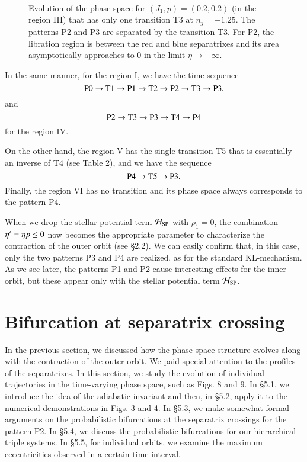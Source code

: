 \documentclass[useAMS,usenatbib,twocolumn]{mn2e}
\begin{document}
\begin{figure*}
\begin{center}
\\
\caption{Evolution of the phase space for $(J_1,p)=(0.2,0.2)$ (in the region III) that has only one transition T3 at $\eta_3=-1.25$.  The patterns P2 and P3 are separated by the transition T3.   For P2, the libration region is  between the red and blue separatrixes and its area asymptotically approaches to 0 in the limit $\eta\to -\infty$. }
\label{fig:phase2}
\end{center}
\end{figure*}


In the same manner, for the region I, we have the time sequence
$$
\rm P0 \to T1 \to P1 \to T2 \to P2 \to T3 \to P3,
$$
and
$$
\rm  P2 \to T3 \to P3  \to T4 \to P4
$$
for the region IV.


On the other hand, the region V has the single transition T5 that is essentially an inverse of T4 (see Table 2), and we have the sequence 
$$
\rm P4 \to T5 \to P3.
$$
Finally, the region VI has no transition and its phase space always corresponds to the pattern P4.





When we drop the stellar potential term ${\cal H}_{\rm SP}$ with $\rho_1=0$, the combination $\eta\rq{}\equiv \eta p\le 0$
now becomes the appropriate parameter to characterize the contraction of the outer orbit (see \S 2.2).  
We can easily confirm that, in this case, only the two patterns P3 and P4 are realized, as for the standard KL-mechanism.
As we see later, the patterns P1 and P2 cause interesting effects for the inner orbit, but these appear only with the stellar potential term ${\cal H}_{\rm SP}$.


\section{Bifurcation at separatrix crossing}
In the previous section, we discussed how the phase-space structure evolves along with the contraction of the outer orbit. 
We paid special attention to the profiles of the separatrixes. In this section, we study the evolution of individual trajectories
in the time-varying phase space, such as Figs. 8 and 9.  In \S 5.1, we introduce the idea of the adiabatic invariant and then, in \S 5.2, apply it 
to the numerical demonstrations in Figs. 3 and 4.
In \S 5.3, we make somewhat formal arguments on the probabilistic bifurcations at the separatrix crossings for the pattern P2. In \S 5.4, we discuss the  probabilistic bifurcations 
for our hierarchical triple systems. In \S 5.5, for individual orbits, we examine the maximum eccentricities observed in a certain time interval.
 
\end{document}

